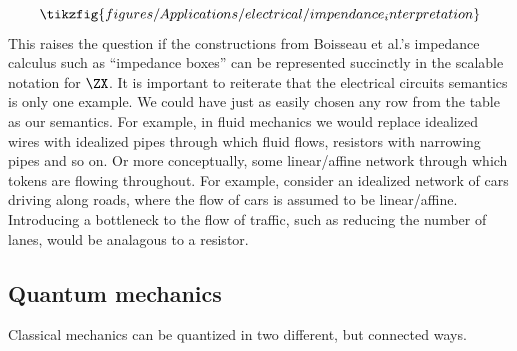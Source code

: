 \begin{equation}
  \tikzfig{figures/Applications/electrical/impendance_interpretation}
\end{equation}
This raises the question if the constructions from Boisseau et al.'s  impedance calculus \cite{Boisseau2022} such as ``impedance boxes'' can be represented succinctly in the scalable notation for \(\ZX\).
It is  important to reiterate that the electrical circuits semantics is only one example.  We could have just as easily chosen any row from the table as our semantics.  For example, in fluid mechanics we would replace idealized wires with idealized pipes through which fluid flows, resistors with narrowing pipes and so on.  Or more conceptually, some linear/affine network through which tokens are flowing throughout.  For example, consider an idealized network of cars driving along roads, where the flow of cars is assumed to be linear/affine.  Introducing a bottleneck to the flow of traffic, such as reducing the number of lanes, would be analagous to a resistor.
\subsection{Quantum mechanics}
Classical mechanics can be quantized in two different, but connected ways.
